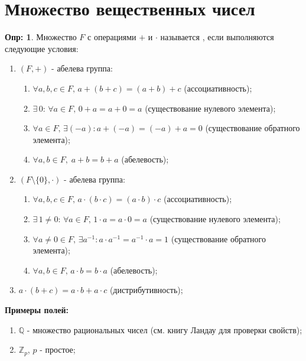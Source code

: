 \documentclass[12pt]{article}
\theoremstyle{definition}
\newtheorem{defn}{Опр:}
\begin{document}

	
\section*{Множество вещественных чисел}


\begin{defn}
	Множество $F$ с операциями $+$ и $\cdot$ называется , если выполняются следующие условия:
	\begin{enumerate}
		\item $(F,+)$ - абелева группа:
		\begin{enumerate}
			\item $\forall a,b,c \in F, \, a + (b + c) = (a + b) + c$ (ассоциативность);
			\item $\exists \, 0\colon \, \forall a \in F, \, 0 + a = a + 0 = a$ (существование нулевого элемента);
			\item $\forall a \in F, \, \exists (-a)\colon a +(-a) = (-a) + a = 0$ (существование обратного элемента);
			\item $\forall a,b \in F, \; a + b = b + a$ (абелевость);
		\end{enumerate}
		\item $(F\setminus\{0\},\cdot)$ - абелева группа:
		\begin{enumerate}
			\item $\forall a,b,c \in F, \, a \cdot (b \cdot c) = (a \cdot b) \cdot c$ (ассоциативность);
			\item $\exists \, 1 \neq 0\colon \, \forall a \in F, \, 1 \cdot a = a \cdot 0 = a$ (существование нулевого элемента);
			\item $\forall a \neq 0 \in F, \, \exists a^{-1}\colon a \cdot a^{-1} = a^{-1} \cdot a = 1$ (существование обратного элемента);
			\item $\forall a,b \in F, \, a \cdot b = b \cdot a$ (абелевость);
		\end{enumerate}
		\item $a\cdot(b + c) = a \cdot b + a \cdot c$ (дистрибутивность);
	\end{enumerate}
\end{defn}

\textbf{Примеры полей:} 
\begin{enumerate}[label={(\arabic*)}]
	\item $\mathbb{Q}$ - множество рациональных чисел (см. книгу Ландау для проверки свойств);
	\item $\mathbb{Z}_p$, $p$ - простое;
\end{enumerate}
\end{document}
